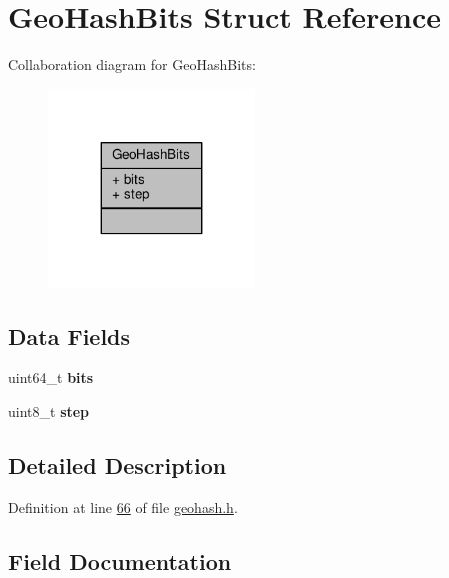 \hypertarget{structGeoHashBits}{}\section{Geo\+Hash\+Bits Struct Reference}
\label{structGeoHashBits}


Collaboration diagram for Geo\+Hash\+Bits\+:\nopagebreak
\begin{figure}[H]
\begin{center}
\leavevmode
\includegraphics[width=155pt]{structGeoHashBits__coll__graph}
\end{center}
\end{figure}
\subsection*{Data Fields}
\begin{DoxyCompactItemize}
\item 
\mbox{\label{structGeoHashBits_ab72063af4534bc9fbfa96c069da5211e}} 
uint64\+\_\+t {\bfseries bits}
\item 
\mbox{\label{structGeoHashBits_aa239ef28dd8d97a7f4eb3c754dce1b90}} 
uint8\+\_\+t {\bfseries step}
\end{DoxyCompactItemize}


\subsection{Detailed Description}


Definition at line \hyperlink{geohash_8h_source_l00066}{66} of file \hyperlink{geohash_8h_source}{geohash.\+h}.



\subsection{Field Documentation}
\mbox{\label{structGeoHashBits_ab72063af4534bc9fbfa96c069da5211e}} 
